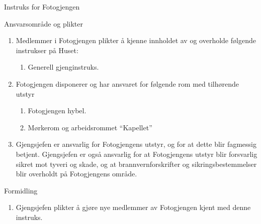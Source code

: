 \begin{instruks*}{Instruks for Fotogjengen}
    \begin{instruksledd}{Ansvarsområde og plikter}
        \begin{enumerate}
            \item Medlemmer i Fotogjengen plikter å kjenne innholdet av og overholde følgende instrukser
                på Huset:
                \begin{enumerate}
                    \item Generell gjenginstruks.
                \end{enumerate}
            \item Fotogjengen disponerer og har ansvaret for følgende rom med tilhørende utstyr
                \begin{enumerate}
                    \item Fotogjengen hybel.
                    \item Mørkerom og arbeidsrommet ``Kapellet''
                \end{enumerate}
            \item Gjengsjefen er ansvarlig for Fotogjengens utstyr, og for at dette blir fagmessig
                betjent. Gjengsjefen er også ansvarlig for at Fotogjengens utstyr blir forsvarlig sikret mot tyveri og skade, og at
                brannvernforskrifter og sikringsbestemmelser blir overholdt på Fotogjengens område.
        \end{enumerate}
    \end{instruksledd}
    
    \begin{instruksledd}{Formidling}
        \begin{enumerate}
            \item Gjengsjefen plikter å gjøre nye medlemmer av Fotogjengen kjent med denne
                instruks.
        \end{enumerate}
    \end{instruksledd}

\end{instruks*}
